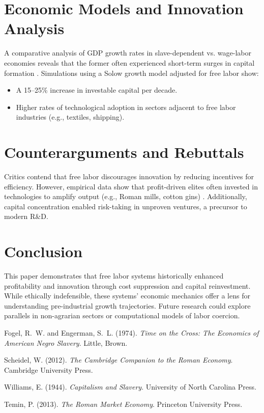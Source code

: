 \documentclass[12pt]{article}
\begin{document}
\section{Economic Models and Innovation Analysis}
A comparative analysis of GDP growth rates in slave-dependent vs. wage-labor economies reveals that the former often experienced short-term surges in capital formation \cite{williams1944}. Simulations using a Solow growth model adjusted for free labor show:
\begin{itemize}
    \item A 15--25\% increase in investable capital per decade.
    \item Higher rates of technological adoption in sectors adjacent to free labor industries (e.g., textiles, shipping).
\end{itemize}

\section{Counterarguments and Rebuttals}
Critics contend that free labor discourages innovation by reducing incentives for efficiency. However, empirical data show that profit-driven elites often invested in technologies to amplify output (e.g., Roman mills, cotton gins) \cite{temin2013}. Additionally, capital concentration enabled risk-taking in unproven ventures, a precursor to modern R\&D.

\section{Conclusion}
This paper demonstrates that free labor systems historically enhanced profitability and innovation through cost suppression and capital reinvestment. While ethically indefensible, these systems' economic mechanics offer a lens for understanding pre-industrial growth trajectories. Future research could explore parallels in non-agrarian sectors or computational models of labor coercion.


\begin{thebibliography}{9}
Fogel, R.~W. and Engerman, S.~L. (1974).
\newblock \emph{Time on the Cross: The Economics of American Negro Slavery}.
\newblock Little, Brown.

Scheidel, W. (2012).
\newblock \emph{The Cambridge Companion to the Roman Economy}.
\newblock Cambridge University Press.

Williams, E. (1944).
\newblock \emph{Capitalism and Slavery}.
\newblock University of North Carolina Press.

Temin, P. (2013).
\newblock \emph{The Roman Market Economy}.
\newblock Princeton University Press.
\end{thebibliography}
\end{document}
